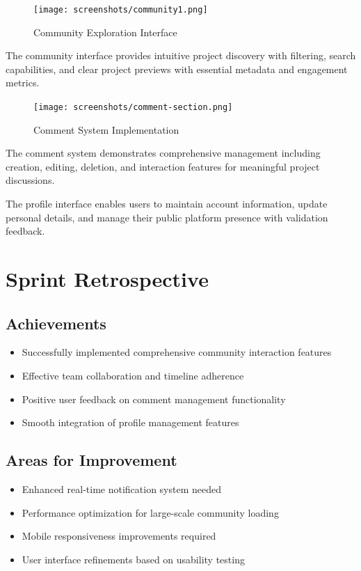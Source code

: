 \begin{figure}[H]
\centering
\texttt{[image: screenshots/community1.png]}
\caption{Community Exploration Interface}
\label{fig:community_main}
\end{figure}

The community interface provides intuitive project discovery with filtering, search capabilities, and clear project previews with essential metadata and engagement metrics.

\begin{figure}[H]
\centering
\texttt{[image: screenshots/comment-section.png]}
\caption{Comment System Implementation}
\label{fig:comment_section}
\end{figure}

The comment system demonstrates comprehensive management including creation, editing, deletion, and interaction features for meaningful project discussions.



The profile interface enables users to maintain account information, update personal details, and manage their public platform presence with validation feedback.

\section{Sprint Retrospective}

\subsection{Achievements}
\begin{itemize}
\item Successfully implemented comprehensive community interaction features
\item Effective team collaboration and timeline adherence
\item Positive user feedback on comment management functionality
\item Smooth integration of profile management features
\end{itemize}

\subsection{Areas for Improvement}
\begin{itemize}
\item Enhanced real-time notification system needed
\item Performance optimization for large-scale community loading
\item Mobile responsiveness improvements required
\item User interface refinements based on usability testing
\end{itemize}

